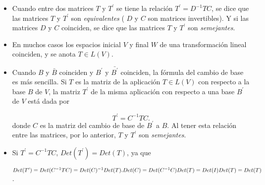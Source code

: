 \begin{remark} 
\label{Obssemejanza}
\begin{itemize}
\item
Cuando entre dos matrices $T$ y  $T^{\prime}$ se tiene la relación 
$T^{\prime}= D^{-1}TC$, se dice que las matrices $T$ y  $T^{\prime}$ son \textit{equivalentes}  (  $D$ y $C$ son matrices invertibles). Y si  las matrices $D$ y $C$ coinciden, se dice que las matrices $T$ y  $T^{\prime}$ son  \textit{semejantes}.

\item
En muchos casos los espacios inicial $V$  y final $W$  de una transformación lineal coinciden, y se anota $T \in L(V)$. 

\item
Cuando  $B$ y $\bar{B}$ coinciden y $B^{\prime}$ y  $\bar{B^{\prime}}$ coinciden, la fórmula del cambio de base es más sencilla. Si $T$ es la matriz de la aplicación $T\in L(V)$ con respecto a la base $B$ de $V$, la matriz $T^{\prime}$ de la misma aplicación con respecto a una base $B^{\prime}$ de $V$  está dada por 


$$T^{\prime}=C^{-1}TC.$$
\noindent
donde $C$ es la matriz del cambio de base de $B^{\prime}$ a $B$.
Al tener esta relación entre las matrices,  por lo anterior, $T$ y  $T^{\prime}$ son \textit{semejantes}. 

\bigskip

\item

 Si $T^{\prime}=C^{-1}TC$, $Det(T^{\prime})=Det(T)$, ya que 
 \bigskip
 
 $Det(T^{\prime})= Det(C^{-1}TC)= Det(C)^{-1}Det(T).Det(C) \\ = Det(C^{-1}C)Det(T)= Det(I)Det(T)=Det(T)$.
 

\end{itemize}

\end{remark}
\bigskip

\bigskip



